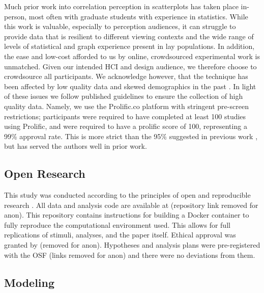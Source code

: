 \documentclass[manuscript, review, anonymous, screen]{acmart}
\begin{document}
Much prior work into correlation perception in scatterplots has taken
place in-person, most often with graduate students with experience in
statistics. While this work is valuable, especially to perception
audiences, it can struggle to provide data that is resilient to
different viewing contexts and the wide range of levels of statistical
and graph experience present in lay populations. In addition, the ease
and low-cost afforded to us by online, crowdsourced experimental work is
unmatched. Given our intended HCI and design audience, we therefore
choose to crowdsource all participants. We acknowledge however, that the
technique has been affected by low quality data and skewed demographics
in the past \citep{chmielewski_2020, charalambides_2021, peer_2021}. In
light of these issues we follow published guidelines \citep{peer_2021}
to ensure the collection of high quality data. Namely, we use the
Prolific.co platform \citep{prolific} with stringent pre-screen
restrictions; participants were required to have completed at least 100
studies using Prolific, and were required to have a prolific score of
100, representing a 99\% approval rate. This is more strict than the
95\% suggested in previous work \citep{peer_2021}, but has served the
authors well in prior work.

\hypertarget{sec-open-research}{%
\subsection{Open Research}\label{sec-open-research}}

This study was conducted according to the principles of open and
reproducible research \citep{ayris_2018}. All data and analysis code are
available at (repository link removed for anon). This repository
contains instructions for building a Docker container to fully reproduce
the computational environment used. This allows for full replications of
stimuli, analyses, and the paper itself. Ethical approval was granted by
(removed for anon). Hypotheses and analysis plans were pre-registered
with the OSF (links removed for anon) and there were no deviations from
them.

\hypertarget{sec-gen-modelling}{%
\subsection{Modeling}\label{sec-gen-modelling}}
\end{document}

